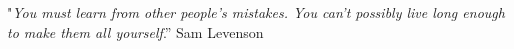 \begin{epigrafe}
    \vspace*{\fill}
	\begin{flushright}
	"\textit{You must learn from other people’s mistakes. You can’t possibly live long enough to make them all yourself}.” Sam Levenson
	\end{flushright}
\end{epigrafe}
